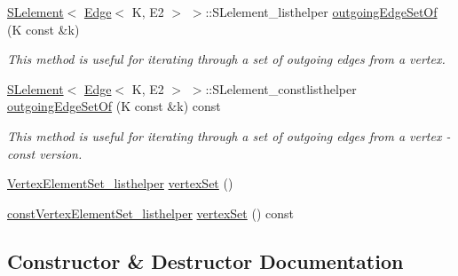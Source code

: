 \begin{DoxyCompactItemize}
\item 
\hyperlink{classbridges_1_1datastructure_1_1_s_lelement}{S\+Lelement}$<$ \hyperlink{classbridges_1_1datastructure_1_1_edge}{Edge}$<$ K, E2 $>$ $>$\+::S\+Lelement\+\_\+listhelper \hyperlink{classbridges_1_1datastructure_1_1_graph_adj_list_ac066da800ab88dc2e55a89650e08bb78}{outgoing\+Edge\+Set\+Of} (K const \&k)
\begin{DoxyCompactList}\small\item\em This method is useful for iterating through a set of outgoing edges from a vertex. \end{DoxyCompactList}\item 
\hyperlink{classbridges_1_1datastructure_1_1_s_lelement}{S\+Lelement}$<$ \hyperlink{classbridges_1_1datastructure_1_1_edge}{Edge}$<$ K, E2 $>$ $>$\+::S\+Lelement\+\_\+constlisthelper \hyperlink{classbridges_1_1datastructure_1_1_graph_adj_list_ab0677da029442194925f8167cc2b8638}{outgoing\+Edge\+Set\+Of} (K const \&k) const
\begin{DoxyCompactList}\small\item\em This method is useful for iterating through a set of outgoing edges from a vertex -\/ const version. \end{DoxyCompactList}\item 
\hyperlink{classbridges_1_1datastructure_1_1_graph_adj_list_1_1_vertex_element_set__listhelper}{Vertex\+Element\+Set\+\_\+listhelper} \hyperlink{classbridges_1_1datastructure_1_1_graph_adj_list_a9dcf0bb4a68f3b02281c84e9bb69d6b3}{vertex\+Set} ()
\item 
\hyperlink{classbridges_1_1datastructure_1_1_graph_adj_list_1_1const_vertex_element_set__listhelper}{const\+Vertex\+Element\+Set\+\_\+listhelper} \hyperlink{classbridges_1_1datastructure_1_1_graph_adj_list_a5ef96f5df21b2f9743b7bb79c10cf090}{vertex\+Set} () const
\end{DoxyCompactItemize}


\subsection{Constructor \& Destructor Documentation}
\mbox{\label{classbridges_1_1datastructure_1_1_graph_adj_list_adb181bcfe104b8df8b3218ccf1b67ea5}} 
